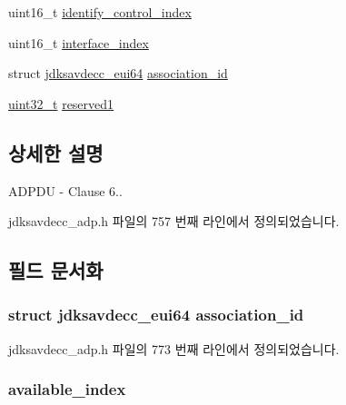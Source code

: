 \begin{DoxyCompactItemize}
\item 
uint16\+\_\+t \hyperlink{structjdksavdecc__adpdu_a69d51a66f10075eb16f0f66089a66a41}{identify\+\_\+control\+\_\+index}
\item 
uint16\+\_\+t \hyperlink{structjdksavdecc__adpdu_a6854e0a91fc5bf42d2186aba65dd247d}{interface\+\_\+index}
\item 
struct \hyperlink{structjdksavdecc__eui64}{jdksavdecc\+\_\+eui64} \hyperlink{structjdksavdecc__adpdu_a0fa49c5118429af7a5ee7d71eada7b94}{association\+\_\+id}
\item 
\hyperlink{parse_8c_a6eb1e68cc391dd753bc8ce896dbb8315}{uint32\+\_\+t} \hyperlink{structjdksavdecc__adpdu_aef9bb556c1530f5d648fd57e73b9a105}{reserved1}
\end{DoxyCompactItemize}


\subsection{상세한 설명}
A\+D\+P\+DU -\/ Clause 6.. 

jdksavdecc\+\_\+adp.\+h 파일의 757 번째 라인에서 정의되었습니다.



\subsection{필드 문서화}
\subsubsection[{\texorpdfstring{association\+\_\+id}{association_id}}]{\setlength{\rightskip}{0pt plus 5cm}struct {\bf jdksavdecc\+\_\+eui64} association\+\_\+id}\hypertarget{structjdksavdecc__adpdu_a0fa49c5118429af7a5ee7d71eada7b94}{}\label{structjdksavdecc__adpdu_a0fa49c5118429af7a5ee7d71eada7b94}


jdksavdecc\+\_\+adp.\+h 파일의 773 번째 라인에서 정의되었습니다.

\subsubsection[{\texorpdfstring{available\+\_\+index}{available_index}}]{ available\+\_\+index}\hypertarget{structjdksavdecc__adpdu_abbe4a72641a81cba6569feb1a446d431}{}\label{structjdksavdecc__adpdu_abbe4a72641a81cba6569feb1a446d431}



